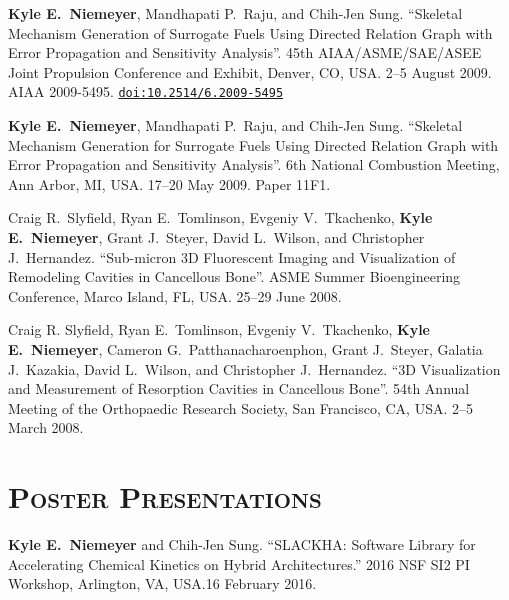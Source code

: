\documentclass[margin,line,11pt]{res}
\makeatletter
\newlength{\bibhang}
\newlength{\bibsep}
 {\@listi \global\bibsep\itemsep \global\advance\bibsep by\parsep}
\newenvironment{bibenum*}
  {\renewcommand\labelenumi{\theenumi.}%
   \etaremune[
     topsep=0pt,
     itemsep=\bibsep,
     parsep=0pt,partopsep=0pt,
     itemindent=-\bibhang,
     leftmargin={\bibhang+\widthof{[999]}}]}
  {\endetaremune}
\newcommand*{\doi}[1]{\href{http://dx.doi.org/#1}{\nolinkurl{doi:#1}}}
\makeatother
\begin{document}
\begin{resume}
\begin{bibenum*}
\item \textbf{Kyle E.\ Niemeyer}, Mandhapati P.\ Raju, and Chih-Jen Sung.
``Skeletal Mechanism Generation of Surrogate Fuels Using Directed Relation Graph with Error Propagation and Sensitivity Analysis''.
45th AIAA\slash ASME\slash SAE\slash ASEE Joint Propulsion Conference and Exhibit, Denver, CO, USA.
2--5 August 2009.
AIAA 2009-5495.
\doi{10.2514/6.2009-5495}

\item \textbf{Kyle E.\ Niemeyer}, Mandhapati P.\ Raju, and Chih-Jen Sung.
``Skeletal Mechanism Generation for Surrogate Fuels Using Directed Relation Graph with Error Propagation and Sensitivity Analysis''.
6th National Combustion Meeting, Ann Arbor, MI, USA.
17--20 May 2009.
Paper 11F1.

\item Craig R.\ Slyfield, Ryan E.\ Tomlinson,  Evgeniy V.\ Tkachenko, \textbf{Kyle E.\ Niemeyer}, Grant J.\ Steyer, David L.\ Wilson, and Christopher J.\ Hernandez.
``Sub-micron 3D Fluorescent Imaging and Visualization of Remodeling Cavities in Cancellous Bone''.
ASME Summer Bioengineering Conference, Marco Island, FL, USA.
25--29 June 2008.

\item Craig R. Slyfield,  Ryan E.\ Tomlinson,  Evgeniy V.\ Tkachenko, \textbf{Kyle E.\ Niemeyer}, Cameron G.\ Patthana\-charoenphon, Grant J.\ Steyer, Galatia J.\ Kazakia, David L.\ Wilson, and Christopher J.\ Hernandez.
``3D Visualization and Measurement of Resorption Cavities in Cancellous Bone''.
54th Annual Meeting of the Orthopaedic Research Society, San Francisco, CA, USA.
2--5 March 2008.

\end{bibenum*}

\section{\textsc{Poster Presentations}}

\begin{bibenum*}

\item \textbf{Kyle E.\ Niemeyer} and Chih-Jen Sung. ``SLACKHA: Software Library for Accelerating Chemical Kinetics on Hybrid Architectures.'' 2016 NSF SI2 PI Workshop, Arlington, VA, USA.16 February 2016.


\end{bibenum*}
\end{resume}
\end{document}
